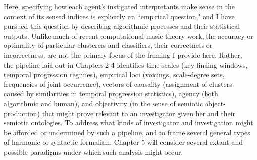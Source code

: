 Here, specifying how each agent's instigated interpretants make sense in the context of its sensed indices is explicitly an ``empirical question," and I have pursued this question by describing algorithmic processes and their statistical outputs.  Unlike much of recent computational music theory work, the accuracy or optimality of particular clusterers and classifiers, their correctness or incorrectness, are not the primary focus of the framing I provide here.  Rather, the pipeline laid out in Chapters 2-4 identifies time scales (key-finding windows, temporal progression regimes), empirical loci (voicings, scale-degree sets, frequencies of joint-occurrence), vectors of causality (assignment of clusters caused by similarities in temporal progression statistics), agency (both algorithmic and human), and objectivity (in the sense of semiotic object-production) that might prove relevant to an investigator given her and their semiotic ontologies.  To address what kinds of investigator and investigation might be afforded or undermined by such a pipeline, and to frame several general types of harmonic or syntactic formalism, Chapter 5 will consider several extant and possible paradigms under which such analysis might occur.